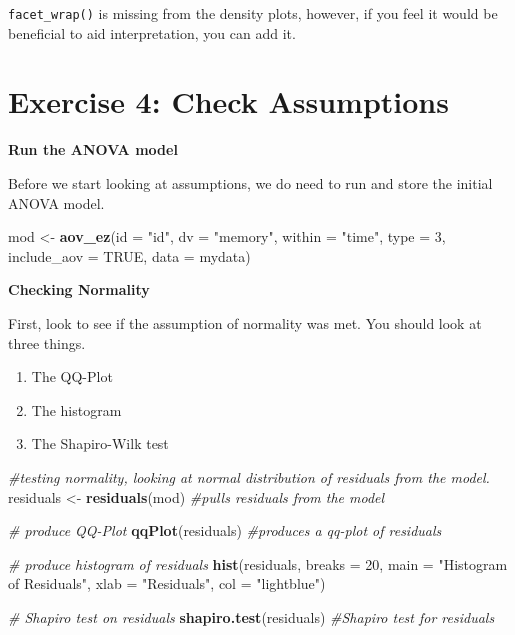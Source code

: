 \documentclass[
]{book}
\newenvironment{Shaded}{\begin{snugshade}}{\end{snugshade}}
\newcommand{\AttributeTok}[1]{\textcolor[rgb]{0.13,0.29,0.53}{#1}}
\newcommand{\CommentTok}[1]{\textcolor[rgb]{0.56,0.35,0.01}{\textit{#1}}}
\newcommand{\ConstantTok}[1]{\textcolor[rgb]{0.56,0.35,0.01}{#1}}
\newcommand{\DecValTok}[1]{\textcolor[rgb]{0.00,0.00,0.81}{#1}}
\newcommand{\FunctionTok}[1]{\textcolor[rgb]{0.13,0.29,0.53}{\textbf{#1}}}
\newcommand{\NormalTok}[1]{#1}
\newcommand{\OtherTok}[1]{\textcolor[rgb]{0.56,0.35,0.01}{#1}}
\newcommand{\StringTok}[1]{\textcolor[rgb]{0.31,0.60,0.02}{#1}}
\providecommand{\tightlist}{%
  \setlength{\itemsep}{0pt}\setlength{\parskip}{0pt}}
\let\oldsection\section
\renewcommand{\section}{\needspace{5\baselineskip}\oldsection}
\begin{document}
\texttt{facet\_wrap()} is missing from the density plots, however, if you feel it would be beneficial to aid interpretation, you can add it.

\section{Exercise 4: Check Assumptions}\label{exercise-4-check-assumptions}

\textbf{Run the ANOVA model}

Before we start looking at assumptions, we do need to run and store the initial ANOVA model.

\begin{Shaded}
\begin{Highlighting}[]
\NormalTok{mod }\OtherTok{\textless{}{-}} \FunctionTok{aov\_ez}\NormalTok{(}\AttributeTok{id =} \StringTok{"id"}\NormalTok{,}
              \AttributeTok{dv =} \StringTok{"memory"}\NormalTok{,}
              \AttributeTok{within =} \StringTok{"time"}\NormalTok{,}
              \AttributeTok{type =} \DecValTok{3}\NormalTok{,}
              \AttributeTok{include\_aov =} \ConstantTok{TRUE}\NormalTok{,}
              \AttributeTok{data =}\NormalTok{ mydata)}
\end{Highlighting}
\end{Shaded}

\textbf{Checking Normality}

First, look to see if the assumption of normality was met. You should look at three things.

\begin{enumerate}
\def\labelenumi{\arabic{enumi})}
\tightlist
\item
  The QQ-Plot
\item
  The histogram
\item
  The Shapiro-Wilk test
\end{enumerate}

\begin{Shaded}
\begin{Highlighting}[]
\CommentTok{\#testing normality, looking at normal distribution of residuals from the model.}
\NormalTok{residuals }\OtherTok{\textless{}{-}} \FunctionTok{residuals}\NormalTok{(mod) }\CommentTok{\#pulls residuals from the model}

\CommentTok{\# produce QQ{-}Plot}
\FunctionTok{qqPlot}\NormalTok{(residuals) }\CommentTok{\#produces a qq{-}plot of residuals}

\CommentTok{\# produce histogram of residuals}
\FunctionTok{hist}\NormalTok{(residuals, }\AttributeTok{breaks =} \DecValTok{20}\NormalTok{, }\AttributeTok{main =} \StringTok{"Histogram of Residuals"}\NormalTok{, }\AttributeTok{xlab =} \StringTok{"Residuals"}\NormalTok{, }\AttributeTok{col =} \StringTok{"lightblue"}\NormalTok{) }

\CommentTok{\# Shapiro test on residuals}
\FunctionTok{shapiro.test}\NormalTok{(residuals) }\CommentTok{\#Shapiro test for residuals}
\end{Highlighting}
\end{Shaded}
\end{document}
